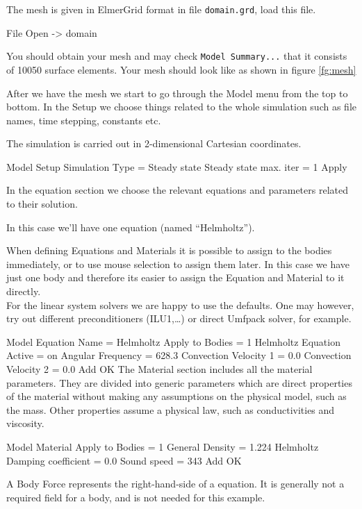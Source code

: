 The mesh is given in ElmerGrid format in file \texttt{domain.grd}, load this file.

\ttbegin
File 
  Open -> domain
\ttend

You should obtain your mesh and may check \texttt{Model Summary...} that it consists of 10050 surface elements.  Your mesh should look like as shown in figure \ref{fg:mesh}

After we have the mesh we start to go through the Model menu from the top to bottom.  In the Setup we choose things related to the whole simulation such as file names, time stepping, constants etc.  

The simulation is carried out in 2-dimensional Cartesian coordinates.

\ttbegin
Model
  Setup 
    Simulation Type = Steady state
    Steady state max. iter = 1
  Apply
\ttend

In the equation section we choose the relevant equations and parameters related to their solution. 

In this case we'll have one equation (named ``Helmholtz'').

When defining Equations and Materials it is possible to assign to the bodies immediately, or to use mouse selection to assign them later. In this case we have just one body and therefore its easier to assign the Equation and Material to it directly.\\

For the linear system solvers we are happy to use the defaults. One may however, try out different preconditioners (ILU1,\ldots) or direct Umfpack solver, for example.

\ttbegin
Model
  Equation
   Name = Helmholtz
    Apply to Bodies = 1
    Helmholtz Equation
      Active = on
      Angular Frequency = 628.3
      Convection Velocity 1 = 0.0
      Convection Velocity 2 = 0.0
    Add 
    OK
\ttend        
The Material section includes all the material parameters. They are divided into generic parameters which are direct properties of the material without making any assumptions on the physical model, such as the mass. Other properties assume a physical law, such as conductivities and viscosity. 

\ttbegin
Model
  Material
    Apply to Bodies = 1 
    General 
      Density = 1.224
    Helmholtz
      Damping coefficient = 0.0
      Sound speed = 343
    Add
    OK
\ttend

A Body Force represents the right-hand-side of a equation. It is generally not a required field for a body, and is not needed for this example.

